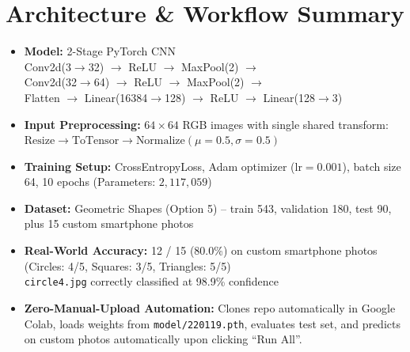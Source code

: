 \documentclass[11pt]{article}
\begin{document}
\section*{Architecture \& Workflow Summary}

\begin{itemize}[leftmargin=*, itemsep=0.2cm]
    \item \textbf{Model:} 2-Stage PyTorch CNN \\
        Conv2d(3$\rightarrow$32) $\rightarrow$ ReLU $\rightarrow$ MaxPool(2) $\rightarrow$ \\
        Conv2d(32$\rightarrow$64) $\rightarrow$ ReLU $\rightarrow$ MaxPool(2) $\rightarrow$ \\
        Flatten $\rightarrow$ Linear(16384$\rightarrow$128) $\rightarrow$ ReLU $\rightarrow$ Linear(128$\rightarrow$3)
    \item \textbf{Input Preprocessing:} $64\times 64$ RGB images with single shared transform: $\text{Resize} \rightarrow \text{ToTensor} \rightarrow \text{Normalize}(\mu=0.5, \sigma=0.5)$
    \item \textbf{Training Setup:} CrossEntropyLoss, Adam optimizer ($\text{lr}=0.001$), batch size 64, 10 epochs (Parameters: $2,117,059$)
    \item \textbf{Dataset:} Geometric Shapes (Option 5) -- train 543, validation 180, test 90, plus 15 custom smartphone photos
    \item \textbf{Real-World Accuracy:} 12 / 15 (80.0\%) on custom smartphone photos \\
        (Circles: 4/5, Squares: 3/5, Triangles: 5/5) \\
        \texttt{circle4.jpg} correctly classified at 98.9\% confidence
    \item \textbf{Zero-Manual-Upload Automation:} Clones repo automatically in Google Colab, loads weights from \texttt{model/220119.pth}, evaluates test set, and predicts on custom photos automatically upon clicking ``Run All''.
\end{itemize}
\end{document}
